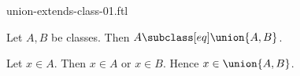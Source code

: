 \documentclass{article}
\begin{document}
\begin{smodule}[creators={Marcel Schütz}]{union-extends-class-01.ftl}

  \begin{fproposition*}[label=8894188219269120]
    Let $A, B$ be classes.
    Then $A \subclass[eq] \union{A,B}$.
  \end{fproposition*}
  \begin{fproof}
    Let $x \in A$.
    Then $x \in A$ or $x \in B$.
    Hence $x \in \union{A,B}$.
  \end{fproof}
\end{smodule}
\end{document}
